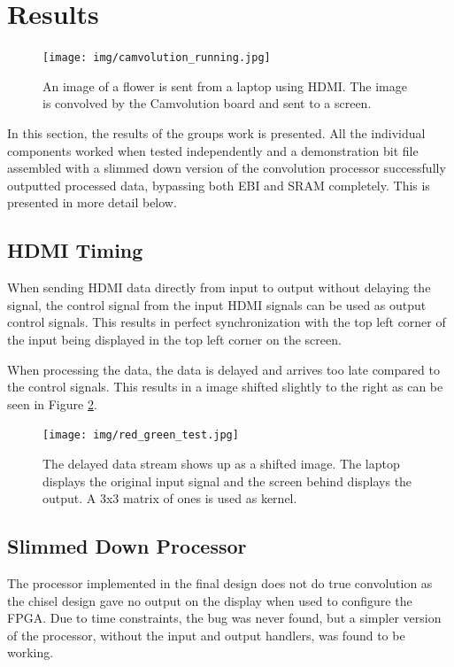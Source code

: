 \section{Results}

\begin{figure}
    \centering
    \texttt{[image: img/camvolution\_running.jpg]}
    \caption[The implemented system running.]{
        An image of a flower is sent from a laptop using HDMI.
				The image is convolved by the Camvolution board and sent to a screen.
    }
    \label{fig:systemRunning}
\end{figure}

In this section, the results of the groups work is presented.
All the individual components worked when tested independently and a demonstration bit file assembled with a slimmed down version of the convolution processor successfully outputted processed data, bypassing both EBI and SRAM completely.
This is presented in more detail below.

\subsection{HDMI Timing}
When sending HDMI data directly from input to output without delaying the signal, the control signal from the input HDMI signals can be used as output control signals.
This results in perfect synchronization with the top left corner of the input being displayed in the top left corner on the screen.

When processing the data, the data is delayed and arrives too late compared to the control signals. This results in a image shifted slightly to the right as can be seen in Figure \ref{fig:SyncDelay}.

\begin{figure}
    \centering
    \texttt{[image: img/red\_green\_test.jpg]}
    \caption[The delayed data stream.]{
        The delayed data stream shows up as a shifted image.
        The laptop displays the original input signal and the screen behind displays the output.
        A 3x3 matrix of ones is used as kernel.
    }
    \label{fig:SyncDelay}
\end{figure}

\subsection{Slimmed Down Processor}
The processor implemented in the final design does not do true convolution as the chisel design gave no output on the display when used to configure the FPGA.
Due to time constraints, the bug was never found, but a simpler version of the processor, without the input and output handlers, was found to be working.

